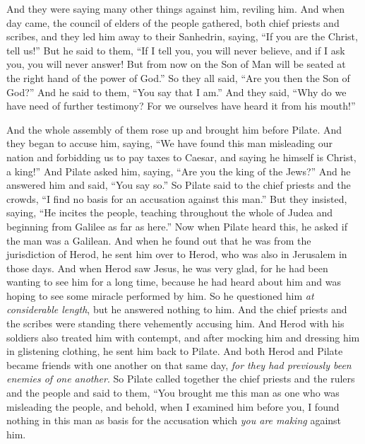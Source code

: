 \begin{biblechapter}
\verse And they were saying many other things against him, reviling him.
 And when day came, the council of elders of the people gathered, both chief priests and scribes, and they led him away to their Sanhedrin,
\verse saying, “If you are the Christ, tell us!” But he said to them, “If I tell you, you will never believe,
\verse and if I ask you, you will never answer!
\verse But from now on the Son of Man will be seated at the right hand of the power of God.”
\verse So they all said, “Are you then the Son of God?” And he said to them, “You say that I am.”
\verse And they said, “Why do we have need of further testimony? For we ourselves have heard it from his mouth!”
\end{biblechapter}

\begin{biblechapter} %
 And the whole assembly of them rose up and brought him before Pilate.
\verse And they began to accuse him, saying, “We have found this man misleading our nation and forbidding us to pay taxes to Caesar, and saying he himself is Christ, a king!”
\verse And Pilate asked him, saying, “Are you the king of the Jews?” And he answered him and said, “You say so.”
\verse So Pilate said to the chief priests and the crowds, “I find no basis for an accusation against this man.”
\verse But they insisted, saying, “He incites the people, teaching throughout the whole of Judea and beginning from Galilee as far as here.”
 Now when Pilate heard this, he asked if the man was a Galilean.
\verse And when he found out that he was from the jurisdiction of Herod, he sent him over to Herod, who was also in Jerusalem in those days.
\verse And when Herod saw Jesus, he was very glad, for he had been wanting to see him for a long time, because he had heard about him and was hoping to see some miracle performed by him.
\verse So he questioned him \textit{at considerable length}, but he answered nothing to him.
\verse And the chief priests and the scribes were standing there vehemently accusing him.
\verse And Herod with his soldiers also treated him with contempt, and after mocking him and dressing him in glistening clothing, he sent him back to Pilate.
\verse And both Herod and Pilate became friends with one another on that same day, \textit{for they had previously been enemies of one another}.
 So Pilate called together the chief priests and the rulers and the people
\verse and said to them, “You brought me this man as one who was misleading the people, and behold, when I examined him before you, I found nothing in this man as basis for the accusation which \textit{you are making} against him.

\end{biblechapter}
